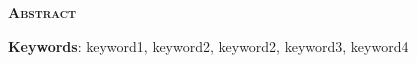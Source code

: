 
\vspace*{45pt}
\begin{flushleft}
	{\Large \textbf{\scshape{Abstract}}}
\end{flushleft}
\vspace*{10pt}


\amostradetexto


\vspace*{20pt}

\noindent \textbf{Keywords}:
keyword1, keyword2, keyword2, keyword3, keyword4

